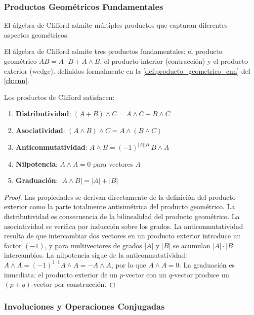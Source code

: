 \subsubsection{Productos Geométricos Fundamentales}

El álgebra de Clifford admite múltiples productos que capturan diferentes aspectos geométricos:

El álgebra de Clifford admite tres productos fundamentales: el producto geométrico $AB = A \cdot B + A \wedge B$, el producto interior (contracción) y el producto exterior (wedge), definidos formalmente en la \autoref{def:producto_geometrico_cnn} del \autoref{ch:cnn}.\label{def:productos_clifford}

\begin{proposition}\label{prop:propiedades_productos_clifford}
Los productos de Clifford satisfacen:
\begin{enumerate}
    \item \textbf{Distributividad}: $(A + B) \wedge C = A \wedge C + B \wedge C$
    \item \textbf{Asociatividad}: $(A \wedge B) \wedge C = A \wedge (B \wedge C)$
    \item \textbf{Anticonmutatividad}: $A \wedge B = (-1)^{|A||B|} B \wedge A$
    \item \textbf{Nilpotencia}: $A \wedge A = 0$ para vectores $A$
    \item \textbf{Graduación}: $|A \wedge B| = |A| + |B|$
\end{enumerate}
\end{proposition}

\begin{proof}
Las propiedades se derivan directamente de la definición del producto exterior como la parte totalmente antisimétrica del producto geométrico. La distributividad es consecuencia de la bilinealidad del producto geométrico. La asociatividad se verifica por inducción sobre los grados. La anticonmutatividad resulta de que intercambiar dos vectores en un producto exterior introduce un factor $(-1)$, y para multivectores de grados $|A|$ y $|B|$ se acumulan $|A| \cdot |B|$ intercambios. La nilpotencia sigue de la anticonmutatividad: $A \wedge A = (-1)^{1 \cdot 1} A \wedge A = -A \wedge A$, por lo que $A \wedge A = 0$. La graduación es inmediata: el producto exterior de un $p$-vector con un $q$-vector produce un $(p+q)$-vector por construcción.
\end{proof}

\subsubsection{Involuciones y Operaciones Conjugadas}

